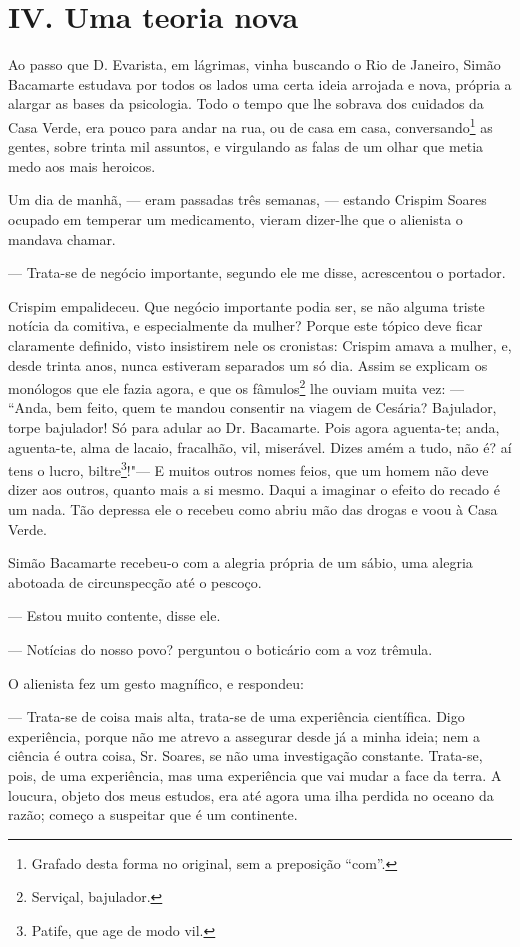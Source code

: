 \chapter{IV. Uma teoria nova }

Ao passo que D. Evarista, em lágrimas, vinha buscando o Rio de Janeiro,
Simão Bacamarte estudava por todos os lados uma certa ideia arrojada e
nova, própria a alargar as bases da psicologia. Todo o tempo que lhe
sobrava dos cuidados da Casa Verde, era pouco para andar na rua, ou de
casa em casa, conversando\footnote{Grafado desta forma no original, sem
  a preposição ``com''.} as gentes, sobre trinta mil assuntos, e
virgulando as falas de um olhar que metia medo aos mais heroicos.

Um dia de manhã, --- eram passadas três semanas, --- estando Crispim
Soares ocupado em temperar um medicamento, vieram dizer-lhe que o
alienista o mandava chamar.

--- Trata-se de negócio importante, segundo ele me disse, acrescentou o
portador.

Crispim empalideceu. Que negócio importante podia ser, se não alguma
triste notícia da comitiva, e especialmente da mulher? Porque este
tópico deve ficar claramente definido, visto insistirem nele os
cronistas: Crispim amava a mulher, e, desde trinta anos, nunca estiveram
separados um só dia. Assim se explicam os monólogos que ele fazia agora,
e que os fâmulos\footnote{Serviçal, bajulador.} lhe ouviam muita vez:
--- ``Anda, bem feito, quem te mandou consentir na viagem de Cesária?
Bajulador, torpe bajulador! Só para adular ao Dr. Bacamarte. Pois agora
aguenta-te; anda, aguenta-te, alma de lacaio, fracalhão, vil, miserável.
Dizes amém a tudo, não é? aí tens o lucro, biltre\footnote{Patife, que
  age de modo vil.}!"--- E muitos outros nomes feios, que um homem não
deve dizer aos outros, quanto mais a si mesmo. Daqui a imaginar o efeito
do recado é um nada. Tão depressa ele o recebeu como abriu mão das
drogas e voou à Casa Verde.

Simão Bacamarte recebeu-o com a alegria própria de um sábio, uma alegria
abotoada de circunspecção até o pescoço.

--- Estou muito contente, disse ele.

--- Notícias do nosso povo? perguntou o boticário com a voz trêmula.

O alienista fez um gesto magnífico, e respondeu:

--- Trata-se de coisa mais alta, trata-se de uma experiência científica.
Digo experiência, porque não me atrevo a assegurar desde já a minha
ideia; nem a ciência é outra coisa, Sr. Soares, se não uma investigação
constante. Trata-se, pois, de uma experiência, mas uma experiência que
vai mudar a face da terra. A loucura, objeto dos meus estudos, era até
agora uma ilha perdida no oceano da razão; começo a suspeitar que é um
continente.

